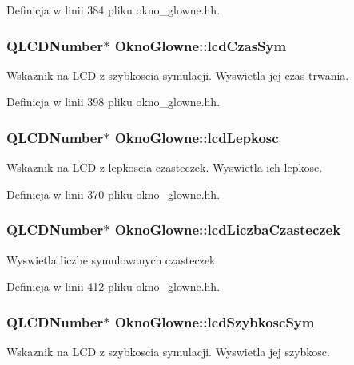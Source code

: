 Definicja w linii 384 pliku okno\-\_\-glowne.\-hh.

\hypertarget{class_okno_glowne_ab34fefe738e38b1b0d4ce764481cc0c6}{
\subsubsection[{lcd\-Czas\-Sym}]{\setlength{\rightskip}{0pt plus 5cm}Q\-L\-C\-D\-Number$\ast$ Okno\-Glowne\-::lcd\-Czas\-Sym\hspace{0.3cm}{\ttfamily [private]}}}\label{class_okno_glowne_ab34fefe738e38b1b0d4ce764481cc0c6}
Wskaznik na L\-C\-D z szybkoscia symulacji. Wyswietla jej czas trwania. 

Definicja w linii 398 pliku okno\-\_\-glowne.\-hh.

\hypertarget{class_okno_glowne_ad279372aa7de9f411ca30749bb587e3c}{
\subsubsection[{lcd\-Lepkosc}]{\setlength{\rightskip}{0pt plus 5cm}Q\-L\-C\-D\-Number$\ast$ Okno\-Glowne\-::lcd\-Lepkosc\hspace{0.3cm}{\ttfamily [private]}}}\label{class_okno_glowne_ad279372aa7de9f411ca30749bb587e3c}
Wskaznik na L\-C\-D z lepkoscia czasteczek. Wyswietla ich lepkosc. 

Definicja w linii 370 pliku okno\-\_\-glowne.\-hh.

\hypertarget{class_okno_glowne_adbdd9fc009725804e015d267dc8375dc}{
\subsubsection[{lcd\-Liczba\-Czasteczek}]{\setlength{\rightskip}{0pt plus 5cm}Q\-L\-C\-D\-Number$\ast$ Okno\-Glowne\-::lcd\-Liczba\-Czasteczek\hspace{0.3cm}{\ttfamily [private]}}}\label{class_okno_glowne_adbdd9fc009725804e015d267dc8375dc}
Wyswietla liczbe symulowanych czasteczek. 

Definicja w linii 412 pliku okno\-\_\-glowne.\-hh.

\hypertarget{class_okno_glowne_ab100c00d4ba33d896fd0985ac366296a}{
\subsubsection[{lcd\-Szybkosc\-Sym}]{\setlength{\rightskip}{0pt plus 5cm}Q\-L\-C\-D\-Number$\ast$ Okno\-Glowne\-::lcd\-Szybkosc\-Sym\hspace{0.3cm}{\ttfamily [private]}}}\label{class_okno_glowne_ab100c00d4ba33d896fd0985ac366296a}
Wskaznik na L\-C\-D z szybkoscia symulacji. Wyswietla jej szybkosc. 

